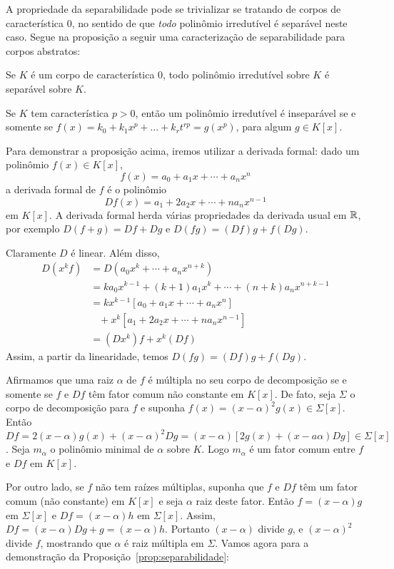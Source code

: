 A propriedade da separabilidade pode se trivializar se tratando de corpos de característica 0, no sentido de que \textit{todo} polinômio irredutível é separável neste caso. Segue na proposição a seguir uma caracterização de separabilidade para corpos abstratos:
\begin{prop} \label{prop:separabilidade}
Se $K$ é um corpo de característica $0$, todo polinômio irredutível sobre $K$ é separável sobre $K$. \par Se $K$ tem característica $p>0$, então um polinômio irredutível é inseparável se e somente se $f(x)= k_0 + k_1x^p+\dots+k_rt^{rp}=g(x^p)$, para algum $g\in K[x]$.
\end{prop}
Para demonstrar a proposição acima, iremos utilizar a derivada formal: dado um polinômio $f(x) \in K[x]$,
\[f(x)=a_0 + a_1x + \cdots +a_nx^n\]
a derivada formal de $f$ é o polinômio
\[Df(x)=a_1 + 2a_2x +\cdots + na_nx^{n-1}\]
em  $K[x]$. A derivada formal herda várias propriedades da derivada usual em $\mathbb{R}$, por exemplo $D(f+g)=Df+Dg$ e $D(fg)=(Df)g + f(Dg)$. \par 
Claramente $D$ é linear. Além disso,
\begin{align*}
    D(x^k f) &= D(a_0x^k + \cdots + a_nx^{n+k}) \\
    &= ka_0x^{k-1} + (k+1)a_1x^{k} + \cdots + (n+k)a_nx^{n+k-1} \\
    &= kx^{k-1}\left[ a_0 + a_1x + \cdots + a_nx^n \right] \\
    &\; \; \; + x^k\left[ a_1 + 2a_2x + \cdots + na_nx^{n-1} \right] \\
    &= (Dx^k)f+x^k(Df)
\end{align*}
Assim, a partir da linearidade, temos $D(fg) = (Df)g+f(Dg)$. \par 
Afirmamos que uma raiz $\alpha$ de $f$ é múltipla no seu corpo de decomposição se e somente se $f$ e $Df$ têm fator comum não constante em $K[x]$. De fato, seja $\Sigma$ o corpo de decomposição para $f$ e suponha $f(x)=(x-\alpha)^2g(x) \in \Sigma[x]$. Então $Df = 2(x-\alpha)g(x) + (x-\alpha)^2 Dg=(x-\alpha)\left[ 2g(x)+(x-a\alpha)Dg \right] \in \Sigma[x]$. Seja $m_{\alpha}$ o polinômio minimal de $\alpha$ sobre $K$. Logo $m_{\alpha}$ é um fator comum entre $f$ e $Df$ em $K[x]$. \par 
Por outro lado, se $f$ não tem raízes múltiplas, suponha que $f$ e $Df$ têm um fator comum (não constante) em $K[x]$ e seja $\alpha$ raiz deste fator. Então $f=(x-\alpha)g$ em $\Sigma[x]$ e $Df = (x-\alpha)h$ em $\Sigma[x]$. Assim, $Df = (x-\alpha)Dg + g = (x-\alpha)h$. Portanto $(x-\alpha)$ divide $g$, e $(x-\alpha)^2$ divide $f$, mostrando que $\alpha$ é raiz múltipla em $\Sigma$. Vamos agora para a demonstração da Proposição~\ref{prop:separabilidade}:
